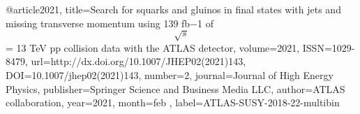 @article{2021, 
    title={Search for squarks and gluinos in final states with jets and missing transverse momentum using 139 fb−1 of $$ \sqrt{s} $$ = 13 TeV pp collision data with the ATLAS detector}, 
    volume={2021}, 
    ISSN={1029-8479}, 
    url={http://dx.doi.org/10.1007/JHEP02(2021)143}, 
    DOI={10.1007/jhep02(2021)143}, 
    number={2}, 
    journal={Journal of High Energy Physics}, 
    publisher={Springer Science and Business Media LLC}, 
    author={ATLAS collaboration}, 
    year={2021}, 
    month=feb ,
    label={ATLAS-SUSY-2018-22-multibin}
}


